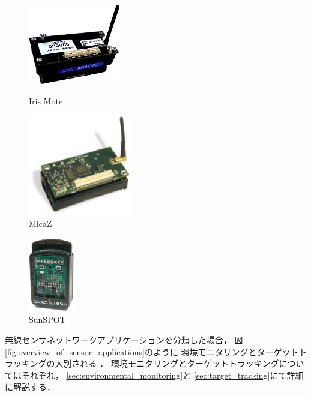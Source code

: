 \begin{figure}[htbp]
 \begin{minipage}{0.5\hsize} \begin{center}
     \includegraphics[width=40mm]{./images/iris_mote.eps}
    \end{center}
    \caption{Iris Mote}
    \label{fig:iris_mote}
 \end{minipage}
 \begin{minipage}{0.5\hsize}
    \begin{center}
     \includegraphics[width=45mm]{./images/micaz.eps}
    \end{center}
    \caption{MicaZ}
    \label{fig:micaz}
 \end{minipage}
\end{figure}

\begin{figure}[htbp]
 \begin{center}
  \includegraphics[width=20mm]{./images/sunspot.eps}
 \end{center}
 \caption{SunSPOT}
 \label{fig:sunspot}
\end{figure}


無線センサネットワークアプリケーションを分類した場合，
図\ref{fig:overview_of_sensor_applications}のように
環境モニタリングとターゲットトラッキングの大別される
\cite{Yick:2008:WSN:1389582.1389832}．
環境モニタリングとターゲットトラッキングについてはそれぞれ，
\ref{sec:environmental_monitoring}と
\ref{sec:target_tracking}にて詳細に解説する．


